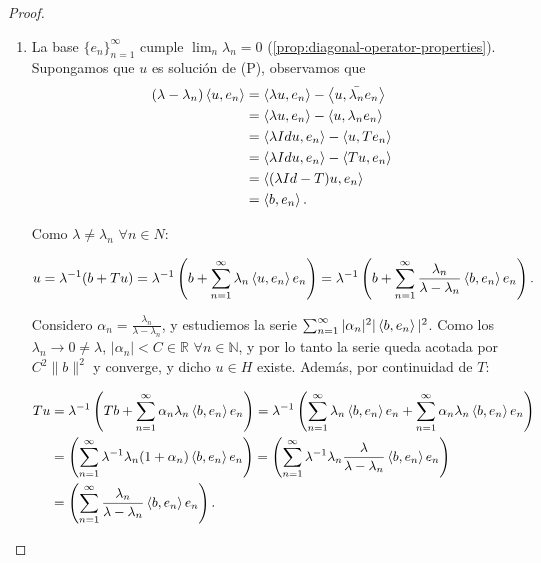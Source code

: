 \begin{proof}\hfill
  \begin{enumerate}
    \item
      La base $\{e_n\}_{n=1}^\infty$ cumple $\lim_n \lambda_n = 0$
      (\ref{prop:diagonal-operator-properties}).
      Supongamos que $u$ es solución de (P), observamos que
      \begin{align*}
        (\lambda-\lambda_n)\left\langle u,e_n\right\rangle &= \left\langle\lambda u,e_n\right\rangle - \left\langle u,\bar{\lambda_n} e_n\right\rangle\\
                                         &= \left\langle\lambda u,e_n\right\rangle - \left\langle u,\lambda_n e_n\right\rangle\\
                                         &= \left\langle\lambda Id u,e_n\right\rangle - \left\langle u,Te_n\right\rangle\\
                                         &= \left\langle\lambda Id u,e_n\right\rangle - \left\langle Tu,e_n\right\rangle \\
                                         &= \left\langle(\lambda Id - T) u,e_n\right\rangle \\
                                         &= \left\langle b,e_n\right\rangle
      .\end{align*}

      Como $\lambda\neq \lambda_n$ $\forall n\in N$:

      \[
      u=\lambda^{-1}(b+Tu)=
      \lambda^{-1}\left(b+\sum_{n=1}^{\infty} \lambda_n\left\langle u,e_n\right\rangle e_n\right)=
      \lambda^{-1}\left(b+\sum_{n=1}^{\infty}
      \frac{\lambda_n}{\lambda-\lambda_n}\left\langle b,e_n\right\rangle e_n\right)
      .\] 

      Considero $\alpha_n=\frac{\lambda_n}{\lambda-\lambda_n}$, y estudiemos la
      serie $\sum_{n=1}^{\infty} |\alpha_n|^2|\left\langle b,e_n\right\rangle|^2$. Como los
      $\lambda_n\to 0\neq \lambda$, $|\alpha_n|<C\in \mathbb{R}$ $\forall n\in
      \mathbb{N}$, y por lo tanto la serie queda acotada por $C^2\|b\|^2$ y
      converge, y dicho $u\in H$ existe. Además, por continuidad de $T$:

      \begin{align*}
        Tu &= \lambda^{-1}\left( Tb+\sum_{n=1}^{\infty} \alpha_n \lambda_n \left\langle b,e_n\right\rangle e_n \right)
           = \lambda^{-1}\left( \sum_{n=1}^{\infty} \lambda_n \left\langle b,e_n\right\rangle e_n + \sum_{n=1}^{\infty} \alpha_n \lambda_n \left\langle b,e_n\right\rangle e_n \right)\\
           &= \left( \sum_{n=1}^{\infty} \lambda^{-1}\lambda_n(1+\alpha_n) \left\langle b,e_n\right\rangle e_n \right)
           = \left( \sum_{n=1}^{\infty} \lambda^{-1}\lambda_n \frac{\lambda}{\lambda-\lambda_n} \left\langle b,e_n\right\rangle e_n \right)\\
           &= \left( \sum_{n=1}^{\infty} \frac{\lambda_n}{\lambda-\lambda_n} \left\langle b,e_n\right\rangle e_n \right)
      .\end{align*}


\end{enumerate}
\end{proof}
